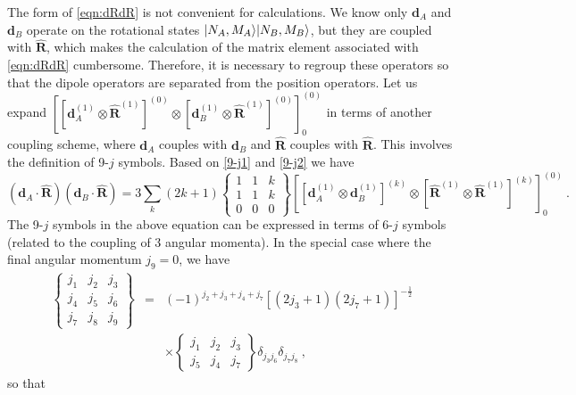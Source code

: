 The form of \autoref{eqn:dRdR} is not convenient for calculations. We know only $\mathbf{d}_A$ and $\mathbf{d}_B$ 
operate on the rotational states $| N_A, M_A \rangle | N_B, M_B \rangle$, but they are coupled with $\mathbf{\hat{R}}$, which makes the calculation of the matrix element associated with \autoref{eqn:dRdR} cumbersome. Therefore, it is necessary to regroup these operators so that the dipole operators are separated from the position operators. 
Let us expand $\left[ \left[ \mathbf{d}_{A}^{(1)} \otimes \mathbf{\hat{R}}^{(1)} \right]^{(0)}\otimes \left[ \mathbf{d}_{B}^{(1)} \otimes \mathbf{\hat{R}}^{(1)} \right]^{(0)}  \right]_{0}^{(0)}$ in terms of another coupling scheme, where $\mathbf{d}_{A}$ couples with $\mathbf{d}_{B}$ and $\mathbf{\hat{R}}$ couples with $\mathbf{\hat{R}}$. 
This involves the definition of 9-$j$ symbols. Based on \autoref{9-j1} and \autoref{9-j2} we have
\begin{equation}
(\mathbf{d}_{A}\cdot\mathbf{\hat{R}})(\mathbf{d}_{B}\cdot\mathbf{\hat{R} })= 3\sum_{k}(2k + 1) 
\left\{
\begin{array}{ccc}
1& 1&k \\
1&1&k \\
0&0&0 
\end{array}
\right\} 
\left[ \left[ \mathbf{d}_{A}^{(1)} \otimes \mathbf{d}_{B}^{(1)} \right]^{(k)}\otimes \left[ \mathbf{\hat{R}}^{(1)} \otimes \mathbf{\hat{R}}^{(1)} \right]^{(k)}  \right]_{0}^{(0)} \ . \label{regrouping}
\end{equation}
The 9-$j$ symbols in the above equation can be expressed in terms of 6-$j$ symbols (related to the coupling of 3 angular momenta). In the special case where the final angular momentum $j_{9}=0$, we have\cite{zare-book}
\begin{eqnarray}
\left\{
\begin{array}{ccc}
j_{1}& j_{2}&j_{3} \\
j_{4}&j_{5}&j_{6} \\
j_{7}&j_{8}&j_{9}
\end{array}
\right\} 
&=&(-1)^{j_{2} + j_{3} + j_{4} + j_{7}}[(2j_{3} +1)(2j_{7} + 1)]^{-\frac{1}{2}} \nonumber \\
&  & \times 
\left\{
\begin{array}{ccc}
j_{1}& j_{2}&j_{3} \\
j_{5}&j_{4}&j_{7} 
\end{array}
\right\} 
\delta_{j_{3}j_{6}}\delta_{j_{7}j_{8}} \ ,
\end{eqnarray}
so that
